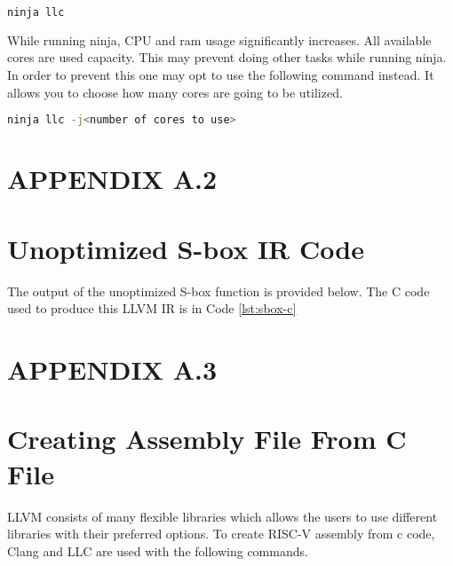 \begin{minipage}[t]{\linewidth}
\begin{lstlisting}[language=Bash, caption={To build llc only which is the binary we modify}]
ninja llc	
\end{lstlisting}
\end{minipage}



While running ninja, CPU and ram usage significantly increases. All available cores are used capacity. This may prevent doing other tasks while running ninja. In order to prevent this one may opt to use the following command instead. It allows you to choose how many cores are going to be utilized.
\begin{lstlisting}[language=Bash]
	ninja llc -j<number of cores to use>
\end{lstlisting}

\newpage
\section*{APPENDIX A.2}
\renewcommand{\theequation}{A.2.\arabic{equation}}
\setcounter{equation}{0}
\section{Unoptimized S-box IR Code}
The output of the unoptimized S-box function is provided below. The C code used to produce this LLVM IR is in Code \ref{lst:sbox-c}



\newpage

\section*{APPENDIX A.3}
\renewcommand{\theequation}{A.2.\arabic{equation}}
\setcounter{equation}{0}

\section{Creating Assembly File From C File}

LLVM consists of many flexible libraries which allows the users to use different libraries with their preferred  options. To create RISC-V assembly from c code, Clang and LLC are used with the following commands. \\

